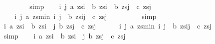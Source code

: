 \begin{isabellebody}
\ \ \ \ \isamarkupfalse%
\ {}\ \isamarkupfalse%
\ simp\isanewline
\ \ \isamarkupfalse%
\ {\isachardoublequoteopen}{\isacharparenleft}{\isasymexists}i\ j{\isachardot}\ a\ {\isacharparenleft}zs{\isasymdagger}{\isachardot}{\isachardot}i{\isacharparenright}\ {\isasymand}\ b\ {\isacharparenleft}zs{\isasymdagger}i{\isachardot}{\isachardot}{\isacharparenright}\ {\isasymand}\ b\ {\isacharparenleft}zs{\isasymdagger}{\isachardot}{\isachardot}j{\isacharparenright}\ {\isasymand}\ c\ {\isacharparenleft}zs{\isasymdagger}j{\isachardot}{\isachardot}{\isacharparenright}{\isacharparenright}\ {\isasymlongleftrightarrow}\ \isanewline
\ \ \ \ {\isacharparenleft}{\isasymexists}i\ j{\isachardot}\ a\ {\isacharparenleft}zs{\isasymdagger}{\isachardot}{\isachardot}min\ i\ j{\isacharparenright}\ {\isasymand}\ b\ {\isacharparenleft}zs{\isasymdagger}i{\isachardot}{\isachardot}j{\isacharparenright}\ {\isasymand}\ c\ {\isacharparenleft}zs{\isasymdagger}j{\isachardot}{\isachardot}{\isacharparenright}{\isacharparenright}{\isachardoublequoteclose}\isanewline
\ \ \ \ \isamarkupfalse%
\ {}\ {}\ \isamarkupfalse%
\ simp\isanewline
\ \ \isamarkupfalse%
\ {\isachardoublequoteopen}{\isacharparenleft}{\isacharparenleft}{\isasymexists}i{\isachardot}\ a\ {\isacharparenleft}zs{\isasymdagger}{\isachardot}{\isachardot}i{\isacharparenright}\ {\isasymand}\ b\ {\isacharparenleft}zs{\isasymdagger}i{\isachardot}{\isachardot}{\isacharparenright}{\isacharparenright}\ {\isasymand}\ {\isacharparenleft}{\isasymexists}j{\isachardot}\ b\ {\isacharparenleft}zs{\isasymdagger}{\isachardot}{\isachardot}j{\isacharparenright}\ {\isasymand}\ c\ {\isacharparenleft}zs{\isasymdagger}j{\isachardot}{\isachardot}{\isacharparenright}{\isacharparenright}{\isacharparenright}\ {\isasymlongleftrightarrow}\ \isanewline
\ \ \ \ {\isacharparenleft}{\isasymexists}i\ j{\isachardot}\ a\ {\isacharparenleft}zs{\isasymdagger}{\isachardot}{\isachardot}min\ i\ j{\isacharparenright}\ {\isasymand}\ b\ {\isacharparenleft}zs{\isasymdagger}i{\isachardot}{\isachardot}j{\isacharparenright}\ {\isasymand}\ c\ {\isacharparenleft}zs{\isasymdagger}j{\isachardot}{\isachardot}{\isacharparenright}{\isacharparenright}{\isachardoublequoteclose}\isanewline
\ \ \ \ \isamarkupfalse%
\ {}\ {}\ \isamarkupfalse%
\ simp\isanewline
\ \ \isamarkupfalse%
\ {\isachardoublequoteopen}{\isacharparenleft}{\isacharparenleft}{\isasymexists}i{\isachardot}\ a\ {\isacharparenleft}zs{\isasymdagger}{\isachardot}{\isachardot}i{\isacharparenright}\ {\isasymand}\ b\ {\isacharparenleft}zs{\isasymdagger}i{\isachardot}{\isachardot}{\isacharparenright}{\isacharparenright}\ {\isasymand}\ {\isacharparenleft}{\isasymexists}j{\isachardot}\ b\ {\isacharparenleft}zs{\isasymdagger}{\isachardot}{\isachardot}j{\isacharparenright}\ {\isasymand}\ c\ {\isacharparenleft}zs{\isasymdagger}j{\isachardot}{\isachardot}{\isacharparenright}{\isacharparenright}{\isacharparenright}\ {\isasymlongleftrightarrow}\ \isanewline

\end{isabellebody}
